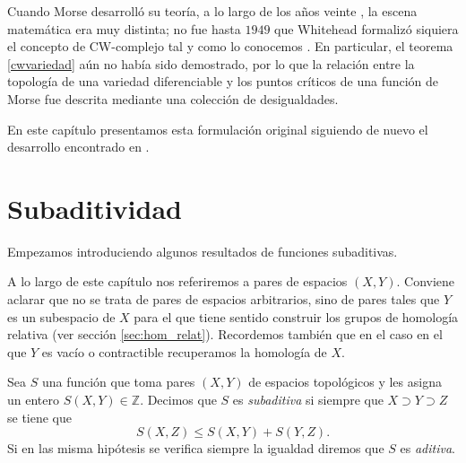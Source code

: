 
Cuando Morse desarrolló su teoría, a lo largo de los años veinte \cite{BottMarstonMorse}, la escena matemática era muy distinta; no fue hasta $1949$ que Whitehead formalizó siquiera el concepto de CW-complejo tal y como lo conocemos \cite{KletteCellComplexesHistory}. En particular, el teorema \ref{cwvariedad} aún no había sido demostrado, por lo que la relación entre la topología de una variedad diferenciable y los puntos críticos de una función de Morse fue descrita mediante una colección de desigualdades. 

En este capítulo presentamos esta formulación original siguiendo de nuevo el desarrollo encontrado en \cite{milnor1963}. 

\section{Subaditividad}

Empezamos introduciendo algunos resultados de funciones subaditivas.

A lo largo de este capítulo nos referiremos a pares de espacios $(X,Y)$. Conviene aclarar que no se trata de pares de espacios arbitrarios, sino de pares tales que $Y$ es un subespacio de $X$ para el que tiene sentido construir los grupos de homología relativa (ver sección \ref{sec:hom_relat}). Recordemos también que en el caso en el que $Y$ es vacío o contractible recuperamos la homología de $X$.

\begin{definition}
    Sea $S$ una función que toma pares $(X,Y)$ de espacios topológicos y les asigna un entero $S(X,Y)\in \mathbb{Z}$. Decimos que $S$ es \textit{subaditiva} si siempre que $X\supset Y\supset Z$ se tiene que
    \begin{equation*}
        S(X,Z) \le S(X,Y) + S(Y,Z).
    \end{equation*}
    Si en las misma hipótesis se verifica siempre la igualdad diremos que $S$ es \textit{aditiva}.
\end{definition}

